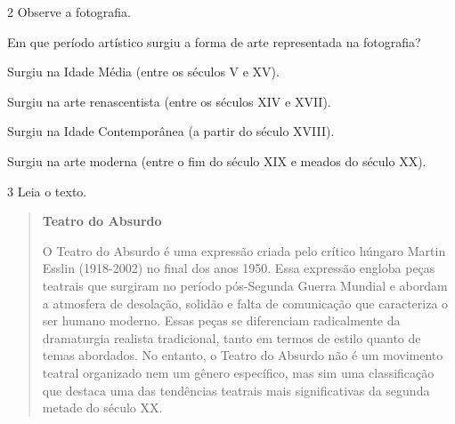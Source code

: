 \num{2} Observe a fotografia.


Em que período artístico surgiu a forma de arte representada na fotografia?

\begin{escolha}
\item Surgiu na Idade Média (entre os séculos V e XV).

\item Surgiu na arte renascentista (entre os séculos XIV e XVII).

\item Surgiu na Idade Contemporânea (a partir do século XVIII).

\item Surgiu na arte moderna (entre o fim do século XIX e meados do século XX).
\end{escolha}


\num{3} Leia o texto.

\begin{quote}
\textbf{Teatro do Absurdo}

O Teatro do Absurdo é uma expressão criada pelo crítico húngaro Martin Esslin (1918-2002) 
no final dos anos 1950. Essa expressão engloba peças teatrais que surgiram no período 
pós-Segunda Guerra Mundial e abordam a atmosfera de desolação, solidão e falta de comunicação 
que caracteriza o ser humano moderno. Essas peças se diferenciam radicalmente da dramaturgia 
realista tradicional, tanto em termos de estilo quanto de temas abordados. No entanto, o 
Teatro do Absurdo não é um movimento teatral organizado nem um gênero específico, mas sim uma 
classificação que destaca uma das tendências teatrais mais significativas da segunda metade 
do século XX.

\end{quote}

